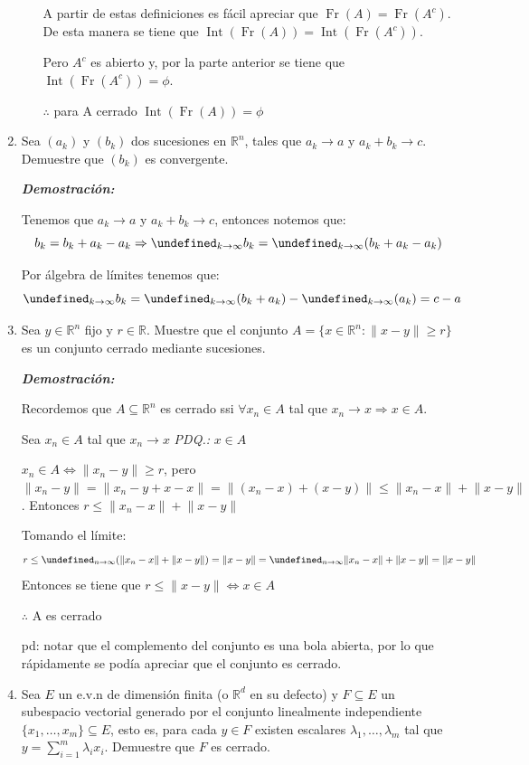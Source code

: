 \documentclass[letterpaper,10pt]{article}
\DeclareMathOperator{\inte}{Int}
\DeclareMathOperator{\fr}{Fr}
\let\lim=\undefined\DeclareMathOperator*{\lim}{\text{lím}}
\newcommand{\R}{\mathbb{R}}
\newcommand{\dem}{\textbf{\emph{Demostraci\'on: }}}
\newcommand{\norm}[1]{\lVert #1\rVert }
\begin{document}
\begin{enumerate}
\begin{itemize}
    A partir de estas definiciones es fácil apreciar que $\fr(A)=\fr(A^c)$.  De esta manera se tiene que $\inte(\fr(A))=\inte(\fr(A^c))$.
    
    Pero $A^c$ es abierto y, por la parte anterior se tiene que $\inte(\fr(A^c))=\phi$.
    
    $\therefore$ para A cerrado $\inte(\fr(A))=\phi$
    
    
\end{itemize}
\item Sea $(a_k)$ y $(b_k)$ dos sucesiones en $\mathbb{R}^n$, tales que $a_k\rightarrow a$ y $a_k+b_k\rightarrow c$. Demuestre  que $(b_k)$ es convergente.

\dem

Tenemos que $a_k\rightarrow a$ y $a_k+b_k\rightarrow c$, entonces notemos que:
\[b_k=b_k+a_k-a_k\Rightarrow \lim_{k\rightarrow\infty} b_k=\lim_{k\rightarrow\infty}(b_k+a_k-a_k)\]

Por álgebra de límites tenemos que:
\[\lim_{k\rightarrow\infty}b_k=\lim_{k\rightarrow\infty}(b_k+a_k)-\lim_{k\rightarrow\infty}(a_k)=c-a\]

\item Sea $y\in\mathbb{R}^n$ fijo y $r\in\mathbb{R}$. Muestre que el conjunto $A=\{x\in\mathbb{R}^n:\norm{x-y}\geq r\}$ es un conjunto cerrado mediante sucesiones.

\dem

Recordemos que $A \subseteq\mathbb{R}^n$ es cerrado ssi $\forall x_n\in A$ tal que $x_n\rightarrow x \Rightarrow x\in A$. 

Sea $x_n\in A$ tal que $x_n\rightarrow x$ \textit{PDQ.:} $x\in A$

$x_n\in A\Leftrightarrow \norm{x_n-y}\geq r$, pero $\norm{x_n-y}=\norm{x_n-y+x-x}=\norm{(x_n-x)+(x-y)}\leq \norm{x_n-x}+\norm{x-y}$. Entonces $r\leq \norm{x_n-x}+\norm{x-y} $

Tomando el límite:
\[r\leq\lim_{n\rightarrow\infty}(\norm{x_n-x}+\norm{x-y})=\norm{x-y}=\lim_{n\rightarrow\infty}\norm{x_n-x}+\norm{x-y}=\norm{x-y} \]
Entonces se tiene que $r\leq\norm{x-y}\Leftrightarrow x\in A$

$\therefore$ A es cerrado

pd: notar que el complemento del conjunto es una bola abierta, por lo que rápidamente se podía apreciar que el conjunto es cerrado.

\item Sea $E$ un e.v.n de dimensión finita (o $\R^d$ en su defecto) y $F\subseteq E$ un subespacio vectorial generado por el conjunto linealmente independiente $\{x_1,\ldots,x_m\}\subseteq E$, esto es, para cada $y\in F$ existen escalares $\lambda_1,\ldots,\lambda_m$ tal que
$y=\sum_{i=1}^m\lambda_i x_i $. Demuestre que $F$ es cerrado.


\end{enumerate}
\end{document}
